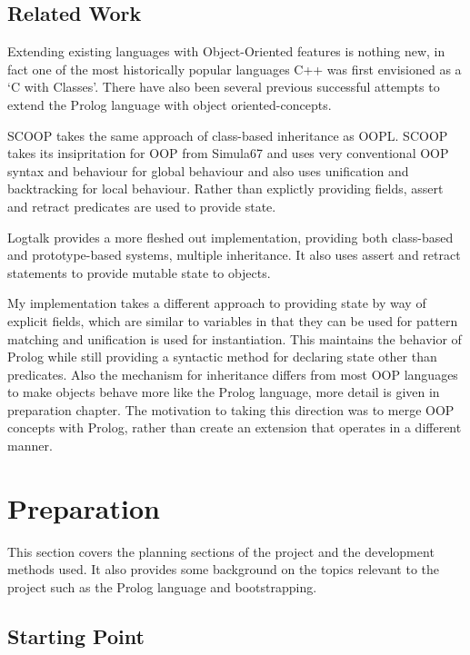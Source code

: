 \documentclass[12pt,a4paper,twoside,openright]{report}
\begin{document}
\section{Related Work}

Extending existing languages with Object-Oriented features is nothing new, in fact one of the most historically popular languages C++ was first envisioned as a `C with Classes'\cite{CPP}. There have also been several previous successful attempts to extend the Prolog language with object oriented-concepts.

\bigskip

SCOOP\cite{SCOOP}  takes the same approach of class-based inheritance as OOPL. SCOOP takes its insipritation for OOP from Simula67 and uses very conventional OOP syntax and behaviour for global behaviour and also uses unification and backtracking for local behaviour. Rather than explictly providing fields, assert and retract predicates are used to provide state.

\bigskip

Logtalk\cite{LOGTALK} provides a more fleshed out implementation, providing both class-based and prototype-based systems, multiple inheritance. It also uses assert and retract statements to provide mutable state to objects. 

\bigskip

My implementation takes a different approach to providing state by way of explicit fields, which are similar to variables in that they can be used for pattern matching and unification is used for instantiation. This maintains the behavior of Prolog while still providing a syntactic method for declaring state other than predicates. Also the mechanism for inheritance differs from most OOP languages to make objects behave more like the Prolog language, more detail is given in preparation chapter. The motivation to taking this direction was to merge OOP concepts with Prolog, rather than create an extension that operates in a different manner.

\chapter{Preparation}

This section covers the planning sections of the project and the development methods used. It also provides some background on the topics relevant to the project such as the Prolog language and bootstrapping.

\section{Starting Point}
\end{document}
